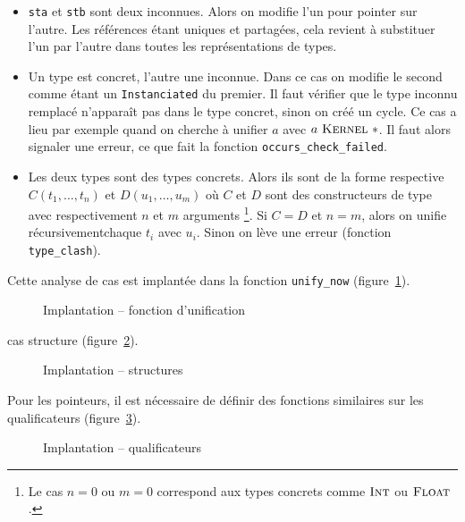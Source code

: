 \begin{itemize}

\item \texttt{sta} et \texttt{stb} sont deux inconnues. Alors on modifie l'un
  pour pointer sur l'autre. Les références étant uniques et partagées, cela
  revient à substituer l'un par l'autre dans toutes les représentations de
  types.

\item Un type est concret, l'autre une inconnue. Dans ce cas on modifie le
  second comme étant un \texttt{Instanciated} du premier. Il faut vérifier que
  le type inconnu remplacé n'apparaît pas dans le type concret, sinon on créé un
  cycle. Ce cas a lieu par exemple quand on cherche à unifier $a$ avec
  $a~\textsc{Kernel}~*$. Il faut alors signaler une erreur, ce que fait la fonction
  \texttt{occurs\_check\_failed}.

\item Les deux types sont des types concrets. Alors ils sont de la forme
  respective
  $C (t_1, …, t_n)$
  et
  $D (u_1, …, u_m)$ où $C$ et $D$ sont des constructeurs de type avec
  respectivement $n$ et $m$ arguments
  \footnote{
    Le cas $n = 0$ ou $m = 0$ correspond aux types concrets comme $\textsc{Int}$ ou
    $\textsc{Float}$.
  }. Si $C = D$ et
  $n = m$, alors on unifie récursivementchaque $t_i$ avec $u_i$. Sinon on lève une erreur
  (fonction \texttt{type\_clash}).


\end{itemize}

Cette analyse de cas est implantée dans la fonction \texttt{unify_now}
(figure~\ref{fig:implem-unify-now}).

\begin{figure}
\caption{Implantation -- fonction d'unification}
\label{fig:implem-unify-now}
\end{figure}

cas structure (figure~\ref{fig:implem-unify-structs}).

\begin{figure}
\caption{Implantation -- structures}
\label{fig:implem-unify-structs}
\end{figure}

Pour les pointeurs, il est nécessaire de définir des fonctions similaires sur
les qualificateurs (figure~\ref{fig:implem-qualifs}).

\begin{figure}


  \caption{Implantation -- qualificateurs}
\label{fig:implem-qualifs}

\end{figure}

